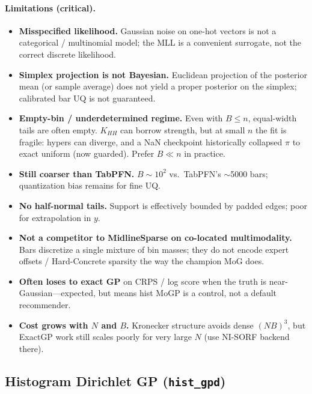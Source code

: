 \documentclass[11pt,a4paper]{article}
\theoremstyle{definition}
\begin{document}
\paragraph{Limitations (critical).}
\begin{itemize}[leftmargin=1.2em,itemsep=2pt]
\item \textbf{Misspecified likelihood.} Gaussian noise on one-hot vectors is not
  a categorical / multinomial model; the MLL is a convenient surrogate, not the
  correct discrete likelihood.
\item \textbf{Simplex projection is not Bayesian.} Euclidean projection of the
  posterior mean (or sample average) does not yield a proper posterior on the
  simplex; calibrated bar UQ is not guaranteed.
\item \textbf{Empty-bin / underdetermined regime.} Even with $B\le n$, equal-width
  tails are often empty. $K_{HH}$ can borrow strength, but at small $n$ the fit
  is fragile: hypers can diverge, and a NaN checkpoint historically collapsed
  $\pi$ to exact uniform (now guarded). Prefer $B\ll n$ in practice.
\item \textbf{Still coarser than TabPFN.} $B\sim 10^2$ vs.\ TabPFN's $\sim$5000
  bars; quantization bias remains for fine UQ.
\item \textbf{No half-normal tails.} Support is effectively bounded by padded
  edges; poor for extrapolation in $y$.
\item \textbf{Not a competitor to MidlineSparse on co-located multimodality.}
  Bars discretize a single mixture of bin masses; they do not encode expert
  offsets / Hard-Concrete sparsity the way the champion MoG does.
\item \textbf{Often loses to exact GP} on CRPS / log score when the truth is
  near-Gaussian---expected, but means hist MoGP is a control, not a default
  recommender.
\item \textbf{Cost grows with $N$ and $B$.} Kronecker structure avoids dense
  $(NB)^3$, but ExactGP work still scales poorly for very large $N$ (use
  NI-SORF backend there).
\end{itemize}

\subsection{Histogram Dirichlet GP (\texttt{hist\_gpd})}
\end{document}
